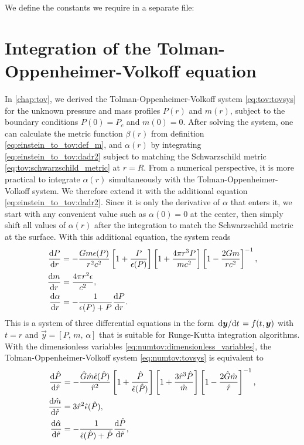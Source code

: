 We define the constants we require in a separate file:


\section{Integration of the Tolman-Oppenheimer-Volkoff equation}
\label{sec:nstars:numtov}

In \cref{chap:tov}, we derived the Tolman-Oppenheimer-Volkoff system \eqref{eq:tov:tovsys} for the unknown pressure and mass profiles $P(r)$ and $m(r)$, subject to the boundary conditions $P(0) = P_c$ and $m(0) = 0$.
After solving the system, one can calculate the metric function $\beta(r)$ from definition \eqref{eq:einstein_to_tov:def_m}, and $\alpha(r)$ by integrating \cref{eq:einstein_to_tov:dadr2} subject to matching the Schwarzschild metric \eqref{eq:tov:schwarzschild_metric} at $r=R$.
From a numerical perspective, it is more practical to integrate $\alpha(r)$ simultaneously with the Tolman-Oppenheimer-Volkoff system.
We therefore extend it with the additional equation \eqref{eq:einstein_to_tov:dadr2}.
Since it is only the derivative of $\alpha$ that enters it, we start with any convenient value such as $\alpha(0) = 0$ at the center, then simply shift all values of $\alpha(r)$ after the integration to match the Schwarzschild metric at the surface.
With this additional equation, the system reads
\begin{subequations}
\label{eq:numtov:tovsys}
\begin{align}
	\odv{P}{r} &= -\frac{G m \epsilon(P)}{r^2 c^2} \left[ 1 + \frac{P}{\epsilon(P)} \right] \left[ 1 + \frac{4 \pi r^3 P}{m c^2} \right] \left[ 1 - \frac{2 G m}{r c^2} \right]^{-1} , \label{eq:numtov:tov_pressure} \\
	\odv{m}{r} &= \frac{4 \pi r^2 \epsilon}{c^2} , \label{eq:numtov:tov_mass} \\
	\odv{\alpha}{r} &= -\frac{1}{\epsilon(P) + P} \odv{P}{r} . \label{eq:numtov:tov_alpha}
\end{align}
\end{subequations}
This is a system of three differential equations in the form $\odv{\vec{y}}/{t} = f(t, \vec{y})$ with $t=r$ and $\vec{y} = [P,\, m,\, \alpha]$ that is suitable for Runge-Kutta integration algorithms.
With the dimensionless variables \eqref{eq:numtov:dimensionless_variables}, the Tolman-Oppenheimer-Volkoff system \eqref{eq:numtov:tovsys} is equivalent to
\begin{subequations}
\label{eq:numtov:tovsys_dimless_simple}
\begin{align}
	\odv{\diml{P}}{\diml{r}} &= - \frac{\diml{G} \diml{m} \diml{\epsilon}(\diml{P})}{\diml{r}^2} \left[ 1 + \frac{\diml{P}}{\diml{\epsilon}(\diml{P})} \right] \left[ 1 + \frac{3 \diml{r}^3 \diml{P}}{\diml{m}} \right] \left[ 1 - \frac{2 \diml{G} \diml{m}}{\diml{r}} \right]^{-1} , \\
	\odv{\diml{m}}{\diml{r}} &= 3 \diml{r}^2 \diml{\epsilon}(\diml{P}) , \\
	\odv{\diml{\alpha}}{\diml{r}} &= -\frac{1}{\diml{\epsilon}(\diml{P})+\diml{P}} \odv{\diml{P}}{\diml{r}} ,
\end{align}
\end{subequations}
